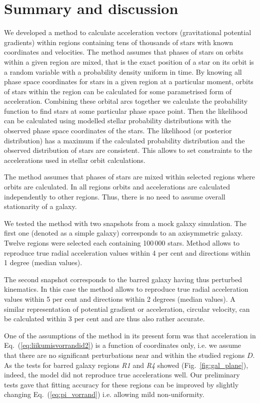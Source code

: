 \documentclass[fleqn,usenatbib]{mnras}
\begin{document}
\section{Summary and discussion} 
\label{sec:summary}
We developed a method to calculate acceleration vectors (gravitational potential gradients) within regions containing tens of thousands of stars with known coordinates and velocities. The method assumes that phases of stars on orbits within a given region are mixed, that is the exact position of a star on its orbit is a random variable with a probability density uniform in time. By knowing all phase space coordinates for stars in a given region at a particular moment, orbits of stars within the region can be calculated for some parametrised form of acceleration. Combining these orbital arcs together we calculate the probability function to find stars at some particular phase space point. Then the likelihood can be calculated using modelled stellar probability distributions with the observed phase space coordinates of the stars. The likelihood (or posterior distribution) has a maximum if the calculated probability distribution and the observed distribution of stars are consistent. This allows to set constraints to the accelerations used in stellar orbit calculations. 

The method assumes that phases of stars are mixed within selected regions where orbits are calculated. In all regions orbits and accelerations are calculated independently to other regions. Thus, there is no need to assume overall stationarity of a galaxy.

We tested the method with two snapshots from a mock galaxy simulation. The first one (denoted as a simple galaxy) corresponds to an axisymmetric galaxy. Twelve regions were selected each containing 100\,000 stars. Method allows to reproduce true radial acceleration values within 4 per cent and directions within 1 degree (median values).

The second snapshot corresponds to the barred galaxy having thus perturbed kinematics. In this case the method allows to reproduce true radial acceleration values within 5 per cent and directions within 2 degrees (median values). A similar representation of potential gradient or acceleration, circular velocity, can be calculated within $3$ per cent and are thus also rather accurate.  

One of the assumptions of the method in its present form was that acceleration in Eq.~(\ref{eq:liikumisvorrandid2}) is a function of coordinates only, i.e. we assume that there are no significant perturbations near and within the studied regions $D$. As the tests for barred galaxy regions \textit{R1} and \textit{R4} showed (Fig.~\ref{fig:gal_plane}), indeed, the model did not reproduce true accelerations well. Our preliminary tests gave that fitting accuracy for these regions can be improved by slightly changing Eq.~(\ref{eq:pi_vorrand}) i.e. allowing mild non-uniformity. 
\end{document}
